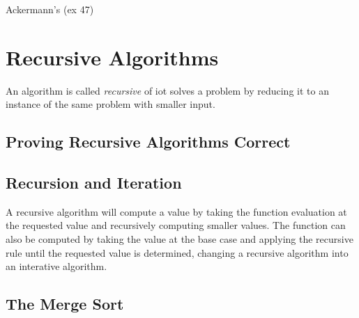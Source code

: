 Ackermann's (ex 47)

\section {Recursive Algorithms}
  \begin {definition}
An algorithm is called \textit{recursive} of iot solves a problem by reducing it to an instance of the same problem with smaller input.
\end{definition}

  \subsection {Proving Recursive Algorithms Correct}
  \subsection {Recursion and Iteration}
A recursive algorithm will compute a value by taking the function evaluation at the requested value and recursively computing smaller values. The function can also be computed by taking the value at the base case and applying the recursive rule until the requested value is determined, changing a recursive algorithm into an interative algorithm.

  \subsection {The Merge Sort}

\

\newpage
